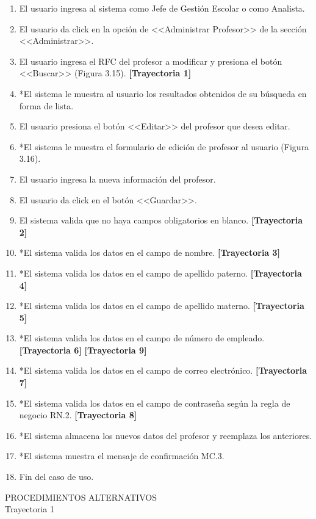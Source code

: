 \begin{enumerate}
	\item El usuario ingresa al sistema como Jefe de Gestión Escolar o como Analista.
	\item El usuario da click en la opción de <<Administrar Profesor>> de la sección <<Administrar>>.
	\item El usuario ingresa el RFC del profesor a modificar y presiona el botón <<Buscar>> (Figura 3.15).
	\textbf{[Trayectoria 1]}
	\item *El sistema le muestra al usuario los resultados obtenidos de su búsqueda en forma de lista.
	\item El usuario presiona el botón <<Editar>> del profesor que desea editar.
	\item *El sistema le muestra el formulario de edición de profesor al usuario (Figura 3.16).
	\item El usuario ingresa la nueva información del profesor.
	\item El usuario da click en el botón <<Guardar>>.
	\item El sistema valida que no haya campos obligatorios en blanco. \textbf{[Trayectoria 2]}
	\item *El sistema valida los datos en el campo de nombre. \textbf{[Trayectoria 3]}
	\item *El sistema valida los datos en el campo de apellido paterno. \textbf{[Trayectoria 4]}
	\item *El sistema valida los datos en el campo de apellido materno. \textbf{[Trayectoria 5]}
	\item *El sistema valida los datos en el campo de número de empleado. \textbf{[Trayectoria 6]} \textbf{[Trayectoria 9]}
	\item *El sistema valida los datos en el campo de correo electrónico. \textbf{[Trayectoria 7]}
	\item *El sistema valida los datos en el campo de contraseña según la regla de negocio RN.2. \textbf{[Trayectoria 8]}
	\item *El sistema almacena los nuevos datos del profesor y reemplaza los anteriores.
	\item *El sistema muestra el mensaje de confirmación MC.3.
	\item Fin del caso de uso.
\end{enumerate}
\vspace*{1cm}
\Large{PROCEDIMIENTOS ALTERNATIVOS}\\
\large{Trayectoria 1}\\
